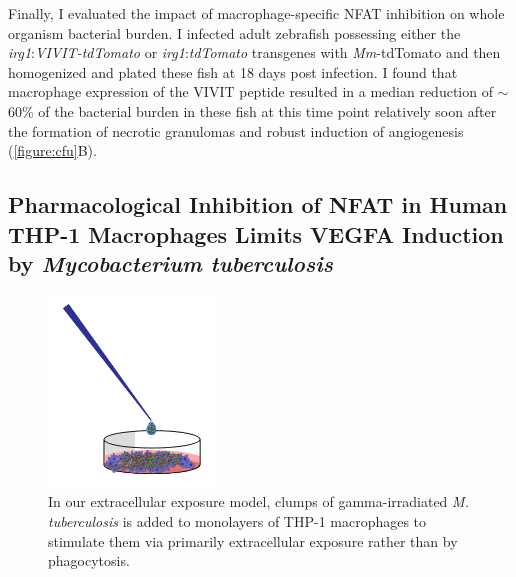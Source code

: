 Finally, I evaluated the impact of macrophage\hyp{}specific NFAT inhibition on whole organism bacterial burden. I infected adult zebrafish possessing either the \textit{irg1}:\textit{VIVIT\hyp{}tdTomato} or \textit{irg1}:\textit{tdTomato} transgenes with \textit{Mm}\hyp{}tdTomato and then homogenized and plated these fish at 18 days post infection. I found that macrophage expression of the VIVIT peptide resulted in a median reduction of ${\sim}$60\% of the bacterial burden in these fish at this time point relatively soon after the formation of necrotic granulomas and robust induction of angiogenesis (\autoref{figure:cfu}B).
 
\subsection{Pharmacological Inhibition of NFAT in Human \mbox{THP\hyp{}1} Macrophages Limits VEGFA Induction by \textit{Mycobacterium tuberculosis}}\label{thp1inca}

\begin{figure}
\centering
\includegraphics[height=2in]{images/gammamtbthp1model.pdf}
\caption[Model of extracellular exposure of $\upgamma$\hyp{}\textit{Mtb} to THP\hyp{}1 macrophages]{In our extracellular exposure model, clumps of gamma\hyp{}irradiated \textit{M. tuberculosis} is added to monolayers of THP\hyp{}1 macrophages to stimulate them via primarily extracellular exposure rather than by phagocytosis.}
\label{figure:exposure}
\end{figure}

